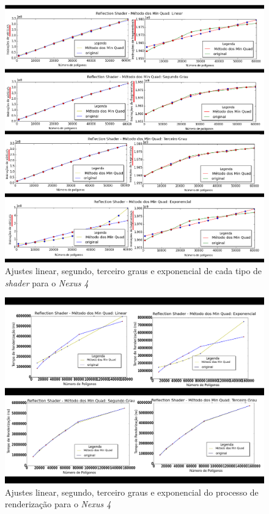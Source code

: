 	\begin{figure}[ht]
	\centering
		\includegraphics[keepaspectratio=true,scale=0.4]{figuras/reflectionlinear_pt.png}
	\caption{Ajustes linear, segundo, terceiro graus e exponencial de cada tipo de \textit{shader} para o \textit{Nexus 4}}
	\label{nexus1_ajuste}
	\end{figure}	

	\begin{figure}[ht]
	\centering
		\includegraphics[keepaspectratio=true,scale=0.4]{figuras/minquad_render_time_pt.png}
	\caption{Ajustes linear, segundo, terceiro graus e exponencial do processo de renderização para o \textit{Nexus 4}}
	\label{nexus2_ajuste}
	\end{figure}	

